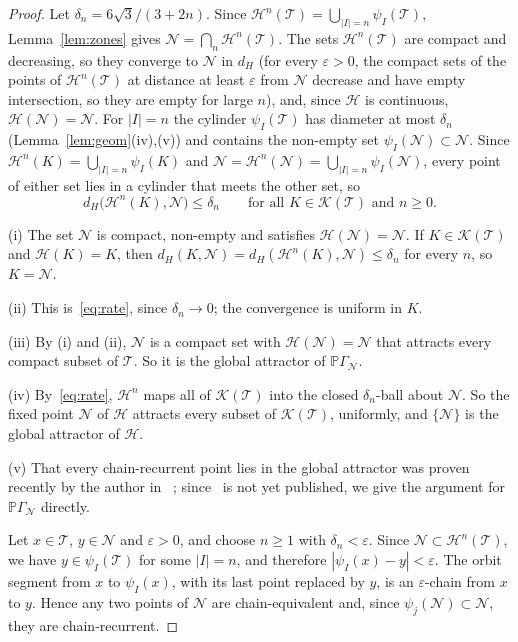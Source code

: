 \documentclass[11pt]{amsart}
\theoremstyle{definition}
\theoremstyle{remark}
\newcommand{\cN}{\mathcal N}
\newcommand{\cT}{\mathcal T}
\newcommand{\PGN}{{\mathbb P}\Gamma_{\mathcal N}}
\newcommand{\abs}[1]{\lvert #1\rvert}
\begin{document}
\thmsinglenode*

\begin{proof}
Let $\delta_n=6\sqrt3/(3+2n)$. Since $\mathcal H^n(\cT)=\bigcup_{\abs I=n}\psi_I(\cT)$,
Lemma~\ref{lem:zones} gives $\cN=\bigcap_n\mathcal H^n(\cT)$. The sets
$\mathcal H^n(\cT)$ are compact and decreasing, so they converge to $\cN$ in $d_H$
(for every $\varepsilon>0$, the compact sets of the points of $\mathcal H^n(\cT)$ at distance at least $\varepsilon$ from $\cN$ decrease and have empty intersection, so they are empty for large $n$),
and, since $\mathcal H$ is continuous, $\mathcal H(\cN)=\cN$. For $\abs I=n$
the cylinder $\psi_I(\cT)$ has diameter at most $\delta_n$
(Lemma~\ref{lem:geom}(iv),(v)) and contains the non-empty set
$\psi_I(\cN)\subset\cN$. Since $\mathcal H^n(K)=\bigcup_{\abs I=n}\psi_I(K)$
and $\cN=\mathcal H^n(\cN)=\bigcup_{\abs I=n}\psi_I(\cN)$, every point of
either set lies in a cylinder that meets the other set, so
\begin{equation}\label{eq:rate}
  d_H\bigl(\mathcal H^n(K),\cN\bigr)\le\delta_n
  \qquad\text{for all }K\in\mathcal K(\cT)\text{ and }n\ge0 .
\end{equation}

(i) The set $\cN$ is compact, non-empty and satisfies
$\mathcal H(\cN)=\cN$. If $K\in\mathcal K(\cT)$ and $\mathcal H(K)=K$, then
$d_H(K,\cN)=d_H(\mathcal H^n(K),\cN)\le\delta_n$ for every $n$, so
$K=\cN$.

(ii) This is~\eqref{eq:rate}, since $\delta_n\to0$; the convergence is uniform
in $K$.

(iii) By (i) and (ii), $\cN$ is a compact set with
$\mathcal H(\cN)=\cN$ that attracts every compact subset of $\cT$. So it is
the global attractor of $\PGN$.

(iv) By~\eqref{eq:rate}, $\mathcal H^n$ maps all of $\mathcal K(\cT)$ into the
closed $\delta_n$-ball about $\cN$. So the fixed point $\cN$ of $\mathcal H$
attracts every subset of $\mathcal K(\cT)$, uniformly, and $\{\cN\}$ is the
global attractor of $\mathcal H$.

(v) That every chain-recurrent point lies in the global attractor was proven recently by the author in ~\cite[Thm.~3]{DLstreams}; since~\cite{DLstreams} is not yet published, we give the argument for $\PGN$ directly. 

Let $x\in\mathcal T$, $y\in \cN$ and $\varepsilon>0$,
and choose $n\geq 1$ with $\delta_n<\varepsilon$.
Since $\cN\subset\mathcal H^n(\mathcal T)$, we have
$y\in\psi_I(\mathcal T)$ for some $|I|=n$, and therefore
$|\psi_I(x)-y|<\varepsilon$.
The orbit segment from $x$ to $\psi_I(x)$, with its
last point replaced by $y$, is an $\varepsilon$-chain
from $x$ to $y$.
Hence any two points of $\cN$ are chain-equivalent
and, since $\psi_j(\cN)\subset \cN$, they are
chain-recurrent.


\end{proof}
\end{document}
